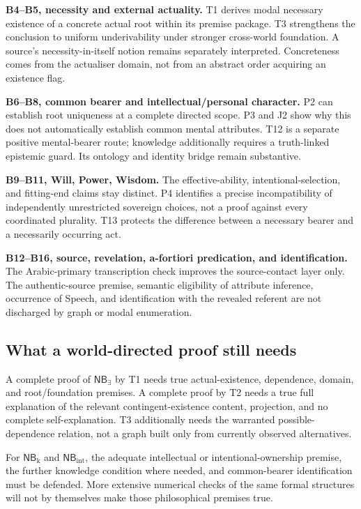 \documentclass[11pt,a4paper]{article}
\begin{document}
\textbf{B4--B5, necessity and external actuality.} T1 derives modal
necessary existence of a concrete actual root within its premise
package. T3 strengthens the conclusion to uniform underivability under
stronger cross-world foundation. A source's necessity-in-itself notion
remains separately interpreted. Concreteness comes from the actualiser
domain, not from an abstract order acquiring an existence flag.

\textbf{B6--B8, common bearer and intellectual/personal character.} P2
can establish root uniqueness at a complete directed scope. P3 and J2
show why this does not automatically establish common mental attributes.
T12 is a separate positive mental-bearer route; knowledge additionally
requires a truth-linked epistemic guard. Its ontology and identity
bridge remain substantive.

\textbf{B9--B11, Will, Power, Wisdom.} The effective-ability,
intentional-selection, and fitting-end claims stay distinct. P4
identifies a precise incompatibility of independently unrestricted
sovereign choices, not a proof against every coordinated plurality. T13
protects the difference between a necessary bearer and a necessarily
occurring act.

\textbf{B12--B16, source, revelation, a-fortiori predication, and
identification.} The Arabic-primary transcription check improves the
source-contact layer only. The authentic-source premise, semantic
eligibility of attribute inference, occurrence of Speech, and
identification with the revealed referent are not discharged by graph or
modal enumeration.

\subsection*{What a world-directed proof still
needs}\label{what-a-world-directed-proof-still-needs}

A complete proof of \(\mathsf{NB}_{\exists}\) by T1 needs true
actual-existence, dependence, domain, and root/foundation premises. A
complete proof by T2 needs a true full explanation of the relevant
contingent-existence content, projection, and no complete
self-explanation. T3 additionally needs the warranted
possible-dependence relation, not a graph built only from currently
observed alternatives.

For \(\mathsf{NB}_{\mathrm{k}}\) and \(\mathsf{NB}_{\mathrm{int}}\), the
adequate intellectual or intentional-ownership premise, the further
knowledge condition where needed, and common-bearer identification must
be defended. More extensive numerical checks of the same formal
structures will not by themselves make those philosophical premises
true.
\end{document}
